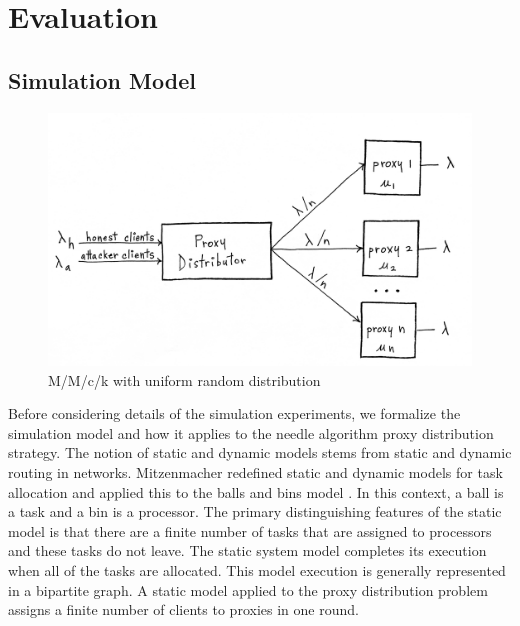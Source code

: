 \chapter{Evaluation}
\label{sec:eval}

\section{Simulation Model} 

\begin{figure}[h!]
\centering
     \includegraphics[width=1.0\textwidth]{fig/mmck_queue.png}
    \caption{M/M/c/k with uniform random distribution}

    \label{fig:mmck}
\end{figure}

Before considering details of the simulation experiments, we formalize the simulation model and how it applies to the needle algorithm proxy distribution strategy. The notion of static and dynamic models stems from static and dynamic routing in networks. Mitzenmacher redefined static and dynamic models for task allocation and applied this to the balls and bins model \cite{mitzenmacher1996power}. In this context, a ball is a task and a bin is a processor. The primary distinguishing features of the static model is that there are a finite number of tasks that are assigned to processors and these tasks do not leave. The static system model completes its execution when all of the tasks are allocated. This model execution is generally represented in a bipartite graph. A static model applied to the proxy distribution problem assigns a finite number of clients to proxies in one round.

